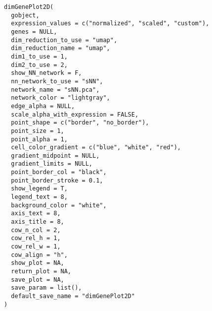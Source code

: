 \documentclass[a4paper]{book}
\begin{document}
%
\begin{Usage}
\begin{verbatim}
dimGenePlot2D(
  gobject,
  expression_values = c("normalized", "scaled", "custom"),
  genes = NULL,
  dim_reduction_to_use = "umap",
  dim_reduction_name = "umap",
  dim1_to_use = 1,
  dim2_to_use = 2,
  show_NN_network = F,
  nn_network_to_use = "sNN",
  network_name = "sNN.pca",
  network_color = "lightgray",
  edge_alpha = NULL,
  scale_alpha_with_expression = FALSE,
  point_shape = c("border", "no_border"),
  point_size = 1,
  point_alpha = 1,
  cell_color_gradient = c("blue", "white", "red"),
  gradient_midpoint = NULL,
  gradient_limits = NULL,
  point_border_col = "black",
  point_border_stroke = 0.1,
  show_legend = T,
  legend_text = 8,
  background_color = "white",
  axis_text = 8,
  axis_title = 8,
  cow_n_col = 2,
  cow_rel_h = 1,
  cow_rel_w = 1,
  cow_align = "h",
  show_plot = NA,
  return_plot = NA,
  save_plot = NA,
  save_param = list(),
  default_save_name = "dimGenePlot2D"
)
\end{verbatim}
\end{Usage}
%
\end{document}

